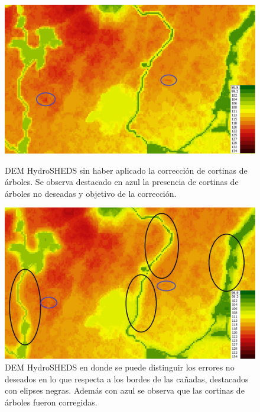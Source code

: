 \documentclass[10pt,a4paper, twoside]{report}
\begin{document}
\begin{figure}[!htb]
   \begin{minipage}{0.48\textwidth}
			\centering
			\includegraphics[width=1.0\linewidth]{imagenes/HydroSHEDSTreesZoom.jpg}
			\caption{DEM HydroSHEDS sin haber aplicado la corrección de cortinas de árboles. Se observa destacado en azul la presencia de cortinas de árboles no deseadas y objetivo de la corrección.}
			\label{HydroSHEDSTreesZoom}
   \end{minipage}\hfill
   \begin {minipage}{0.48\textwidth}
			\centering
			\includegraphics[width=1.0\linewidth]{imagenes/HydroSHEDSTreesZoomCorrected.jpg}
			\caption{DEM HydroSHEDS en donde se puede distinguir los errores no deseados en lo que respecta a los bordes de las cañadas, destacados con elipses negras. Además con azul se observa que las cortinas de árboles fueron corregidas.}
			\label{HydroSHEDSTreesZoomCorrected}
   \end{minipage}
\end{figure}
\end{document}
